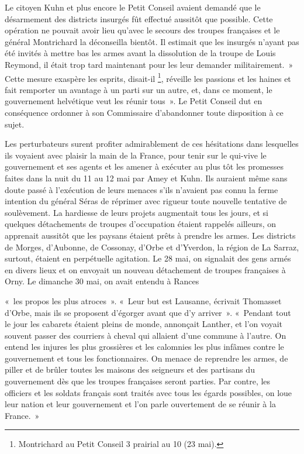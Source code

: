 \documentclass[french,twoside]{book} %
\newenvironment{quoteblock}%
  {\begin{quoting}}
  {\end{quoting}}
\newenvironment{quotebar}{%
    \def\FrameCommand{{\color{rubric!10!}\vrule width 0.5em} \hspace{0.9em}}%
    \def\OuterFrameSep{\itemsep} %
    \MakeFramed {\advance\hsize-\width \FrameRestore}
  }%
  {%
    \endMakeFramed
  }
\renewenvironment{quoteblock}%
  {%
    \savenotes
    \setstretch{0.9}
    \normalfont
    \begin{quotebar}
  }
  {%
    \end{quotebar}
    \spewnotes
  }
\begin{document}
\noindent Le citoyen Kuhn et plus encore le Petit Conseil avaient demandé que le désarmement des districts insurgés fût effectué aussitôt que possible. Cette opération ne pouvait avoir lieu qu’avec le secours des troupes françaises et le général Montrichard la déconseilla bientôt. Il estimait que les insurgés n’ayant pas été invités à mettre bas les armes avant la dissolution de la troupe de Louis Reymond, il était trop tard maintenant pour les leur demander militairement. » Cette mesure exaspère les esprits, disait-il \footnote{Montrichard au Petit Conseil 3 prairial au 10 (23 mai).}, réveille les passions et les haines et fait remporter un avantage à un parti sur un autre, et, dans ce moment, le gouvernement helvétique veut les réunir tous ». Le Petit Conseil dut en conséquence ordonner à son Commissaire d’abandonner toute disposition à ce sujet.\par
Les perturbateurs surent profiter admirablement de ces hésitations dans lesquelles ils voyaient avec plaisir la main de la France, pour tenir sur le qui-vive le gouvernement et ses agents et les amener à exécuter au plus tôt les promesses faites dans la nuit du 11 au 12 mai par Amey et Kuhn. Ils auraient même sans doute passé à l’exécution de leurs menaces s’ils n’avaient pas connu la ferme intention du général Séras de réprimer avec rigueur toute nouvelle tentative de soulèvement. La hardiesse de leurs projets augmentait tous les jours, et si quelques détachements de troupes d’occupation étaient rappelés ailleurs, on apprenait aussitôt que les paysans étaient prêts à prendre les armes. Les districts de Morges, d’Aubonne, de Cossonay, d’Orbe et d’Yverdon, la région de La Sarraz, surtout, étaient en perpétuelle agitation. Le 28 mai, on signalait des gens armés en divers lieux et on envoyait un nouveau détachement de troupes françaises à Orny. Le dimanche 30 mai, on avait entendu à Rances\par

\begin{quoteblock}
 \noindent « les propos les plus atroces ». « Leur but est Lausanne, écrivait Thomasset d’Orbe, mais ils se proposent d’égorger avant que d’y arriver ». « Pendant tout le jour les cabarets étaient pleins de monde, annonçait Lanther, et l’on voyait souvent passer des courriers à cheval qui allaient d’une commune à l’autre. On entend les injures les plus grossières et les calomnies les plus infâmes contre le gouvernement et tous les fonctionnaires. On menace de reprendre les armes, de piller et de brûler toutes les maisons des seigneurs et des partisans du gouvernement dès que les troupes françaises seront parties. Par contre, les officiers et les soldats français sont traités avec tous les égards possibles, on loue leur nation et leur gouvernement et l’on parle ouvertement de se réunir à la France. »
 \end{quoteblock}
\end{document}
